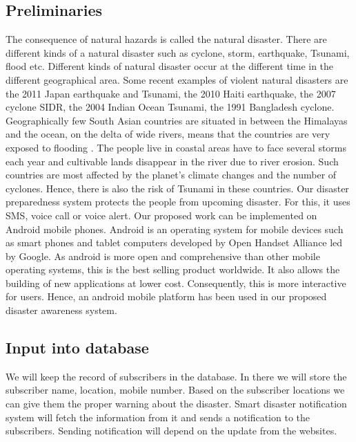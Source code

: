 \documentclass[conference]{IEEEtran}
\begin{document}
\subsection{Preliminaries}
\label{preliminaries}

The consequence of natural hazards is called the natural disaster. There are different kinds of a natural disaster such as cyclone, storm, earthquake, Tsunami, flood etc. Different kinds of natural disaster occur at the different time in the different geographical area. Some recent examples of violent natural disasters are the 2011 Japan earthquake and Tsunami, the 2010 Haiti earthquake, the 2007 cyclone SIDR, the 2004 Indian Ocean Tsunami, the 1991 Bangladesh cyclone. Geographically few South Asian countries are situated in between the Himalayas and the ocean, on the delta of wide rivers, means that the countries are very exposed to flooding \cite{latif2011openstreetmap}.  The people live in coastal areas have to face several storms each year and cultivable lands disappear in the river due to river erosion. Such countries are most affected by the planet’s climate changes and the number of cyclones. Hence, there is also the risk of Tsunami in these countries. Our disaster preparedness system protects the people from upcoming disaster. For this, it uses SMS, voice call or voice alert. Our proposed work can be implemented on Android mobile phones. Android \cite{developers2011android} is an operating system for mobile devices such as smart phones and tablet computers developed by Open Handset Alliance led by Google. As android is more open and comprehensive than other mobile operating systems, this is the best selling product worldwide. It also allows the building of new applications at lower cost. Consequently, this is more interactive for users. Hence, an android mobile platform has been used in our proposed disaster awareness system.


\subsection{Input into database}

We will keep the record of subscribers in the database. In there we will store the subscriber name, location, mobile number. Based on the subscriber locations we can give them the proper warning about the disaster. Smart disaster notification system will fetch the information from it and sends a notification to the subscribers. Sending notification will depend on the update from the websites.
\end{document}
